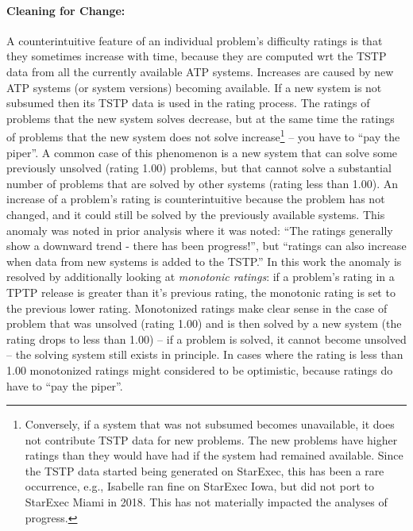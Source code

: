 \documentclass[runningheads]{llncs}
\begin{document}
\paragraph{Cleaning for Change:}
A counterintuitive feature of an individual problem's difficulty ratings is that they sometimes 
increase with time, because they are computed wrt the TSTP data from all the currently available
ATP systems.
Increases are caused by new ATP systems (or system versions) becoming available.
If a new system is not subsumed then its TSTP data is used in the rating process.
The ratings of problems that the new system solves decrease, but at the same time the ratings of
problems that the new system does not solve increase\footnote{%
Conversely, if a system that was not subsumed becomes unavailable, it does not contribute TSTP
data for new problems.
The new problems have higher ratings than they would have had if the system had remained
available.
Since the TSTP data started being generated on StarExec, this has been a rare occurrence, e.g.,
Isabelle ran fine on StarExec Iowa, but did not port to StarExec Miami in 2018.
This has not materially impacted the analyses of progress.} -- you have to ``pay the piper''.
A common case of this phenomenon is a new system that can solve some previously unsolved
(rating 1.00) problems, but that cannot solve a substantial number of problems that are solved
by other systems (rating less than 1.00).
An increase of a problem's rating is counterintuitive because the problem has not changed, and 
it could still be solved by the previously available systems.
This anomaly was noted in prior analysis \cite{Sut17} where it was noted: ``The ratings generally 
show a downward trend - there has been progress!'', but ``ratings can also increase when data 
from new systems is added to the TSTP.''
In this work the anomaly is resolved by additionally looking at {\em monotonic ratings}:
if a problem's rating in a TPTP release is greater than it's previous rating, the monotonic 
rating is set to the previous lower rating.
Monotonized ratings make clear sense in the case of problem that was unsolved (rating 1.00) and 
is then solved by a new system (the rating drops to less than 1.00) -- if a problem is 
solved, it cannot become unsolved -- the solving system still exists in principle.
In cases where the rating is less than 1.00 monotonized ratings might considered to be 
optimistic, because ratings do have to ``pay the piper''.

\end{document}
